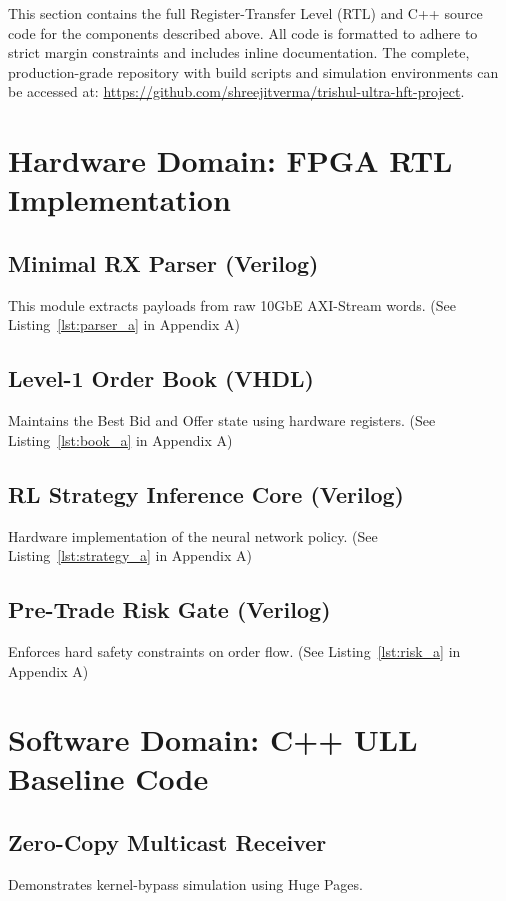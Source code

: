 This section contains the full Register-Transfer Level (RTL) and C++ source code for the components described above. All code is formatted to adhere to strict margin constraints and includes inline documentation. The complete, production-grade repository with build scripts and simulation environments can be accessed at: \url{https://github.com/shreejitverma/trishul-ultra-hft-project}.

\section{Hardware Domain: FPGA RTL Implementation}

\subsection{Minimal RX Parser (Verilog)}
This module extracts payloads from raw 10GbE AXI-Stream words.
(See Listing~\ref{lst:parser_a} in Appendix A)

\subsection{Level-1 Order Book (VHDL)}
Maintains the Best Bid and Offer state using hardware registers.
(See Listing~\ref{lst:book_a} in Appendix A)

\subsection{RL Strategy Inference Core (Verilog)}
Hardware implementation of the neural network policy.
(See Listing~\ref{lst:strategy_a} in Appendix A)

\subsection{Pre-Trade Risk Gate (Verilog)}
Enforces hard safety constraints on order flow.
(See Listing~\ref{lst:risk_a} in Appendix A)

\section{Software Domain: C++ ULL Baseline Code}

\subsection{Zero-Copy Multicast Receiver}
Demonstrates kernel-bypass simulation using Huge Pages.

